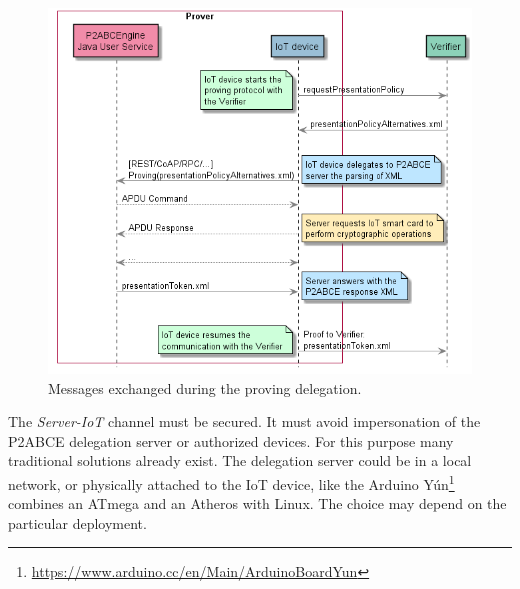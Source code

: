 \begin{figure}[bth]
	\centering
	\includegraphics[width=\linewidth]{gfx/UML/provingDelegation}
	\caption{Messages exchanged during the proving delegation.}
	\label{fig:DelegationProving}
\end{figure}



The \textit{Server-IoT} channel must be secured. It must avoid impersonation of the P2ABCE delegation server or authorized devices. For this purpose many traditional solutions already exist. The delegation server could be in a local network, or physically attached to the IoT device, like the Arduino Y\'un\footnote{\url{https://www.arduino.cc/en/Main/ArduinoBoardYun}} combines an ATmega and an Atheros with Linux. The choice may depend on the particular deployment.




